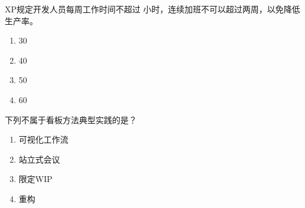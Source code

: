 \begin{problem}
	XP规定开发人员每周工作时间不超过 \myline 小时，连续加班不可以超过两周，以免降低生产率。
    \vspace{-0.8em}
    \begin{multicols}{4}
        \begin{enumerate}[label=\Alph*.]
            \item 30
            \item 40
            \item 50
            \item 60
        \end{enumerate}
    \end{multicols}
    \vspace{-1em}
\end{problem}



\begin{problem}
	下列不属于看板方法典型实践的是？
    \vspace{-0.8em}
    \begin{multicols}{4}
        \begin{enumerate}[label=\Alph*.]
            \item 可视化工作流
            \item 站立式会议
            \item 限定WIP
            \item 重构
        \end{enumerate}
    \end{multicols}
    \vspace{-1em}
\end{problem}

